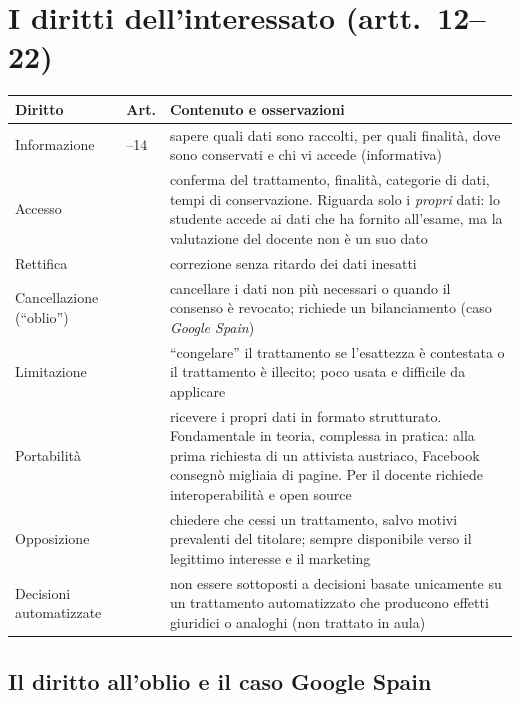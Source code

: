 \section{I diritti dell'interessato (artt.~12--22)}
\label{sec:gdpr-diritti}

\begingroup\small
\begin{longtable}{>{\raggedright\arraybackslash}p{3.4cm} >{\raggedright\arraybackslash}p{1.3cm} >{\raggedright\arraybackslash}p{9.4cm}}
\toprule
\textbf{Diritto} & \textbf{Art.} & \textbf{Contenuto e osservazioni}\\
\midrule
\endhead
Informazione & 13--14 & sapere quali dati sono raccolti, per quali finalità, dove sono conservati e chi
  vi accede (informativa)\\
Accesso & 15 & conferma del trattamento, finalità, categorie di dati, tempi di conservazione. Riguarda
  solo i \emph{propri} dati: lo studente accede ai dati che ha fornito all'esame, ma la valutazione del
  docente non è un suo dato\\
Rettifica & 16 & correzione senza ritardo dei dati inesatti\\
Cancellazione (``oblio'') & 17 & cancellare i dati non più necessari o quando il consenso è revocato;
  richiede un bilanciamento (caso \emph{Google Spain})\\
Limitazione & 18 & ``congelare'' il trattamento se l'esattezza è contestata o il trattamento è illecito;
  poco usata e difficile da applicare\\
Portabilità & 20 & ricevere i propri dati in formato strutturato. Fondamentale in teoria, complessa in
  pratica: alla prima richiesta di un attivista austriaco, Facebook consegnò migliaia di pagine. Per il
  docente richiede interoperabilità e open source\\
Opposizione & 21 & chiedere che cessi un trattamento, salvo motivi prevalenti del titolare; sempre
  disponibile verso il legittimo interesse e il marketing\\
Decisioni automatizzate & 22 & non essere sottoposti a decisioni basate unicamente su un trattamento
  automatizzato che producono effetti giuridici o analoghi (non trattato in aula)\\
\bottomrule
\end{longtable}
\endgroup

\subsection{Il diritto all'oblio e il caso Google Spain}
